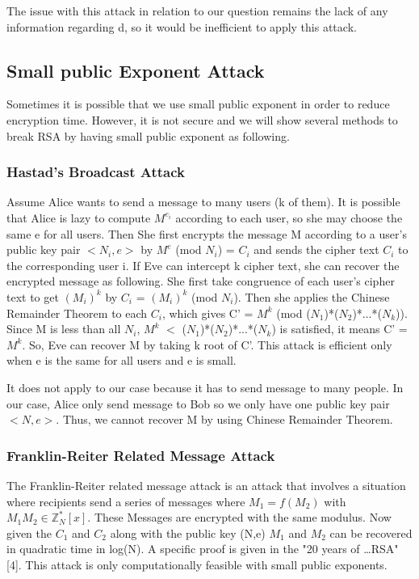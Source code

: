 \documentclass[12pt]{article} %
\begin{document}
The issue with this attack in relation to our question remains the lack of any information regarding d, so it would be inefficient to apply this attack.


\subsection{ Small public Exponent Attack}
		Sometimes it is possible that we use small public exponent in order to reduce encryption time. However, it is not secure and we will show several methods to break RSA by having small public exponent as following.

\subsubsection{Hastad's Broadcast Attack}
		Assume Alice wants to send a message to many users (k of them). It is possible that Alice is lazy to compute $M^{e_i}$ according to each user, so she may choose the same e for all users.
		Then She first encrypts the message M according to a user's public key pair $<N_i, e>$ by $M^e$ (mod $N_i$) = $C_i$ and sends the cipher text $C_i$ to the corresponding user i. 
		If Eve can intercept k cipher text, she can recover the encrypted message as following.
		She first take congruence of each user's cipher text to get $(M_i)^k$ by $C_i$ = $(M_i)^k$ (mod $N_i$). Then she applies the Chinese Remainder Theorem to each $C_i$, which gives C' = $M^k$ (mod ($N_1$)*($N_2$)*...*($N_k$)).
		Since M is less than all $N_i$, $M^k$ $<$ ($N_1$)*($N_2$)*...*($N_k$) is satisfied, it means C' = $M^k$. So, Eve can recover M by taking k root of C'.
		This attack is efficient only when e is the same for all users and e is small.
		
		It does not apply to our case because it has to send message to many people. In our case, Alice only send message to Bob so we only have one public key pair $<N, e>$. Thus, we cannot recover M by using Chinese Remainder Theorem.
		
\subsubsection{Franklin-Reiter Related Message Attack}
		The Franklin-Reiter related message attack is an attack that involves a situation where recipients send a series of messages where $M_1 = f(M_2)$ with $M_1M_2 \in \mathbb{Z}^{*}_N[x] $. These Messages are encrypted with the same modulus. Now given the $C_1$ and $C_2$ along with the public key (N,e) $M_1$ and $M_2$ can be recovered in quadratic time in log(N). A specific proof is given in the "20 years of \dots RSA" [4]. This attack is only computationally feasible with small public exponents.
		
\end{document}

